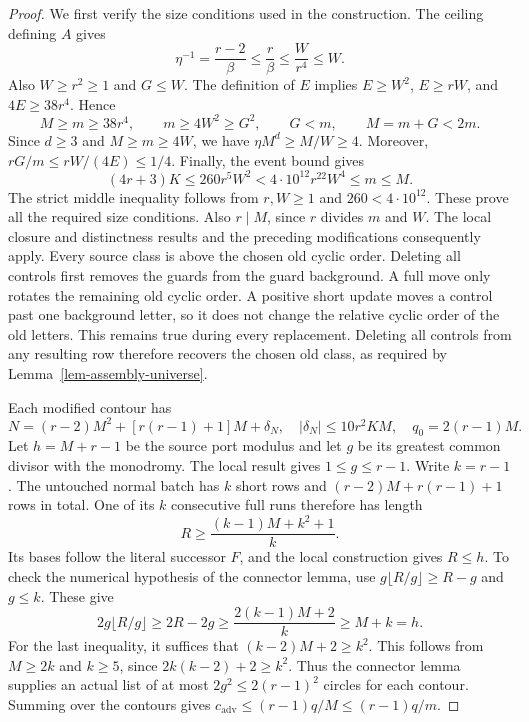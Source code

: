 \begin{proof}
We first verify the size conditions used in the construction. The ceiling
defining $A$ gives
\[
 \eta^{-1}=\frac{r-2}{\beta}\le\frac{r}{\beta}
 \le\frac{W}{r^4}\le W.
\]
Also $W\ge r^2\ge1$ and $G\le W$. The definition of $E$ implies
$E\ge W^2$, $E\ge rW$, and $4E\ge38r^4$. Hence
\[
 M\ge m\ge38r^4,\qquad
 m\ge4W^2\ge G^2,\qquad
 G<m,\qquad M=m+G<2m.
\]
Since $d\ge3$ and $M\ge m\ge4W$, we have
$\eta M^d\ge M/W\ge4$. Moreover,
$rG/m\le rW/(4E)\le1/4$. Finally, the event bound gives
\[
 (4r+3)K\le260r^5W^2<4\cdot10^{12}r^{22}W^4\le m\le M.
\]
The strict middle inequality follows from $r,W\ge1$ and
$260<4\cdot10^{12}$. These prove all the required size conditions.
Also $r\mid M$, since $r$ divides $m$ and $W$. The local closure and
distinctness results and the preceding modifications consequently apply.
Every source class is above the chosen old cyclic order. Deleting all
controls first removes the guards from the guard background. A full move
only rotates the remaining old cyclic order. A positive short update
moves a control past one background letter, so it does not change the
relative cyclic order of the old letters. This remains true during every
replacement. Deleting all controls from any resulting row therefore
recovers the chosen old class, as required by
Lemma~\ref{lem-assembly-universe}.

Each modified contour has
\[
 N=(r-2)M^2+[r(r-1)+1]M+\delta_N,
 \quad |\delta_N|\le10r^2KM,\quad q_0=2(r-1)M.
\]
Let $h=M+r-1$ be the source port modulus and let $g$ be its greatest
common divisor with the monodromy. The local result gives $1\le g\le r-1$.
Write $k=r-1$. The untouched normal batch has $k$ short rows and
$(r-2)M+r(r-1)+1$ rows in total. One of its $k$ consecutive full runs
therefore has length
\[
 R\ge\frac{(k-1)M+k^2+1}{k}.
\]
Its bases follow the literal successor $F$, and the local construction
gives $R\le h$. To check the numerical hypothesis of the connector
lemma, use $g\lfloor R/g\rfloor\ge R-g$ and $g\le k$. These give
\[
 2g\lfloor R/g\rfloor
 \ge2R-2g
 \ge\frac{2(k-1)M+2}{k}
 \ge M+k=h.
\]
For the last inequality, it suffices that $(k-2)M+2\ge k^2$.
This follows from $M\ge2k$ and $k\ge5$, since
$2k(k-2)+2\ge k^2$. Thus the connector lemma supplies an actual list
of at most $2g^2\le2(r-1)^2$ circles for each contour.
Summing over the contours gives
$c_{\mathrm{adv}}\le(r-1)q/M\le(r-1)q/m$.


\end{proof}
